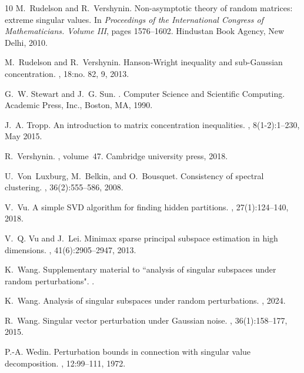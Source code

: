 \documentclass[reqno]{amsart}
\theoremstyle{plain}
\theoremstyle{definition}
\begin{document}
\begin{thebibliography}{10}
M.~Rudelson and R.~Vershynin.
\newblock Non-asymptotic theory of random matrices: extreme singular values.
\newblock In {\em Proceedings of the {I}nternational {C}ongress of
  {M}athematicians. {V}olume {III}}, pages 1576--1602. Hindustan Book Agency,
  New Delhi, 2010.

M.~Rudelson and R.~Vershynin.
\newblock Hanson-{W}right inequality and sub-{G}aussian concentration.
, 18:no. 82, 9, 2013.

G.~W. Stewart and J.~G. Sun.
.
\newblock Computer Science and Scientific Computing. Academic Press, Inc.,
  Boston, MA, 1990.

J.~A. Tropp.
\newblock An introduction to matrix concentration inequalities.
, 8(1-2):1--230, May 2015.

R.~Vershynin.
, volume~47.
\newblock Cambridge university press, 2018.

U.~Von~Luxburg, M.~Belkin, and O.~Bousquet.
\newblock Consistency of spectral clustering.
, 36(2):555--586, 2008.

V.~Vu.
\newblock A simple {SVD} algorithm for finding hidden partitions.
, 27(1):124--140, 2018.

V.~Q. Vu and J.~Lei.
\newblock Minimax sparse principal subspace estimation in high dimensions.
, 41(6):2905--2947, 2013.

K.~Wang.
\newblock Supplementary material to ``analysis of singular subspaces under
  random perturbations".
.

K.~Wang.
\newblock Analysis of singular subspaces under random perturbations.
, 2024.

R.~Wang.
\newblock Singular vector perturbation under {G}aussian noise.
, 36(1):158--177, 2015.

P.-A. Wedin.
\newblock Perturbation bounds in connection with singular value decomposition.
, 12:99--111, 1972.


\end{thebibliography}
\end{document}
